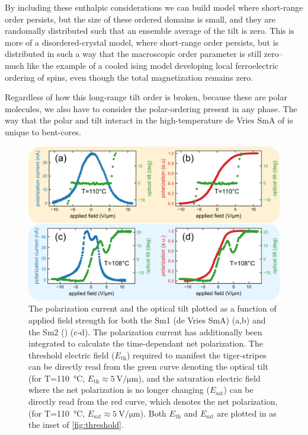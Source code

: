 \documentclass[aagreenthesis]{subfiles}
\begin{document}
By including these enthalpic considerations we can build model where short-range order persists, but the size of
these ordered domains is small, and they are randomally distributed such that
an ensemble average of the tilt is zero. This is more of a disordered-crystal
model, where short-range order persists, but is distributed in such a way that the
macroscopic order parameter is still zero-- much like the example of a cooled
ising model developing local ferroelectric ordering of spins, even though the
total magnetization remains zero. 

Regardless of how this long-range tilt order is broken, because these are polar
molecules, we also have to consider the polar-ordering present in any phase.
The way that the polar and tilt interact in the high-temperature de Vries SmA of
\nfour{} is unique to bent-cores.

\begin{figure}[h!]
    \centering
    \includegraphics[width=.6\textwidth]{./figs/pal30/prc/PRCvsTilt/PRCVtilt.png}
    \caption{\label{fig:homog:pal30pvt} The polarization current and the optical
    tilt plotted as a function of applied field strength for both the Sm1
(de Vries SmA) (a,b) and the Sm2 (\smcpalpha{}) (c-d). The polarization current
has additionally been integrated to calculate the time-dependant net
polarization. The threshold electric field ($E_\textrm{th}$) required to manifest the tiger-stripes can
be directly read from the green curve denoting the optical tilt (for
T=\SI{110}{\degreeCelsius}, $E_\textrm{th} \approx \SI{5}{\volt\per\micro\metre}$),
and the saturation electric field where the net polarization is no longer
changing ($E_\textrm{sat}$) can be directly
read from the red curve, which denotes the net polarization, (for
T=\SI{110}{\degreeCelsius}, $E_\textrm{sat} \approx \SI{5}{\volt\per\micro\metre}$).
Both $E_\textrm{th}$ and $E_\textrm{sat}$ are plotted in as the inset of
\autoref{fig:threshold}. }
\end{figure}
\end{document}
